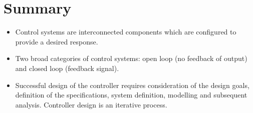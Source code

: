 \documentclass[class=report, crop=false, 12pt,a4paper]{standalone}
\begin{document}
\section{Summary}
\begin{itemize}
  \item Control systems are interconnected components which are configured to provide a desired response.
  \item Two broad categories of control systems: open loop (no feedback of output) and closed loop (feedback signal).
  \item Successful design of the controller requires consideration of the design goals, definition of the specifications, system definition, modelling and subsequent analysis. Controller design is an iterative process.
\end{itemize}
\end{document}
